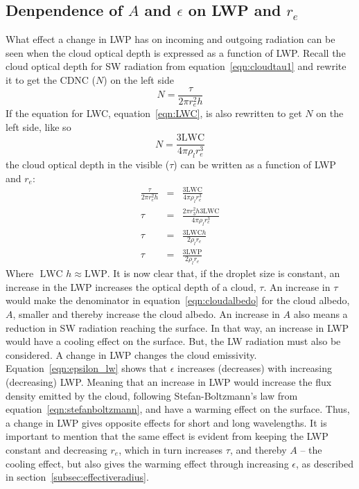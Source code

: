 \subsection{Denpendence of $A$ and $\epsilon$ on LWP and $r_e$}
\label{subsec:dependalbeps}
What effect a change in LWP has on incoming and outgoing radiation can be seen when the cloud optical depth is expressed as a function of LWP. Recall the cloud optical depth for SW radiation from equation~\ref{eqn:cloudtau1} and rewrite it to get the CDNC ($N$) on the left side
\begin{equation}
N = \frac{\tau}{2\pi r^2_e h}
\end{equation}
If the equation for LWC, equation~\ref{eqn:LWC}, is also rewritten to get $N$ on the left side, like so
\begin{equation}
N = \frac{3\text{LWC}}{4\pi \rho_l r^3_e}
\end{equation}
the cloud optical depth in the visible ($\tau$) can be written as a function of LWP and $r_e$:
\begin{eqnarray}
\frac{\tau}{2\pi r^2_e h} &=& \frac{3\text{LWC}}{4\pi \rho_l r^3_e}\\
\tau &=& \frac{2\pi r^2_3 h 3\text{LWC}}{4\pi \rho_l r^3_e}\\
\tau &=& \frac{3\text{LWC} h}{2\rho_l r_e}\\
\tau &=& \frac{3\text{LWP}}{2\rho_l r_e}
\label{eqn:cloudtau}
\end{eqnarray}
Where $\text{ LWC }h \approx \text{LWP}$. It is now clear that, if the droplet size is constant, an increase in the LWP increases the optical depth of a cloud, $\tau$. An increase in $\tau$ would make the denominator in equation~\ref{eqn:cloudalbedo} for the cloud albedo, $A$, smaller and thereby increase the cloud albedo. An increase in $A$ also means a reduction in SW radiation reaching the surface. In that way, an increase in LWP would have a cooling effect on the surface. 
But, the LW radiation must also be considered. A change in LWP changes the cloud emissivity. Equation~\ref{eqn:epsilon_lw} shows that $\epsilon$ increases (decreases) with increasing (decreasing) LWP. Meaning that an increase in LWP would increase the flux density emitted by the cloud, following Stefan-Boltzmann's law from equation~\ref{eqn:stefanboltzmann}, and have a warming effect on the surface. Thus, a change in LWP gives opposite effects for short and long wavelengths. It is important to mention that the same effect is evident from keeping the LWP constant and decreasing $r_e$, which in turn increases $\tau$, and thereby $A$ -- the cooling effect, but also gives the warming effect through increasing $\epsilon$, as described in section~\ref{subsec:effectiveradius}.

